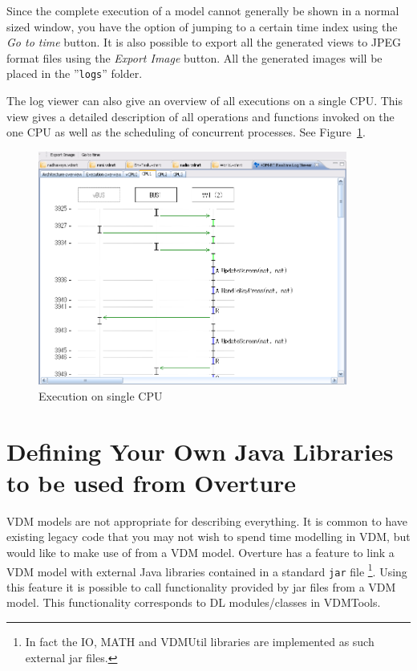 \documentclass{overturerepchap}
\begin{document}
Since the complete execution of a model cannot generally be shown in a normal
sized window, you have the option of jumping to a certain time index
using the \emph{Go to time} button. It is
also possible to export all the generated views to JPEG format files
using the \emph{Export Image} button. All
the generated images will be placed in the ''\texttt{logs}'' folder.

The log viewer can
also give an overview of all executions on a single CPU. This view
gives a detailed description of all operations and functions invoked
on the one CPU as well as the scheduling of concurrent processes. See
Figure~\ref{fig:userguide:ExecutionCPU}. 

\begin{figure}[htp]
\begin{center}
  \includegraphics[width=4in]{figures/ExecutionCPU}
  \caption{Execution on single CPU}
  \label{fig:userguide:ExecutionCPU}
\end{center}
\end{figure}

\chapter{Defining Your Own Java Libraries to be used from Overture}\label{sec:javalibs}

VDM models are not appropriate for describing everything. It is common
to have existing legacy code that you may not
wish to spend time modelling in VDM, but would like to make use of
from a VDM model. Overture has a feature to link a VDM
model with external Java libraries contained in a standard \texttt{jar} file
\footnote{In fact the IO, MATH and VDMUtil libraries are implemented as such
external jar files.}.
Using this feature it is possible 
to call functionality provided by jar files from a VDM model. This functionality
corresponds to DL modules/classes in VDMTools\cite{DLMan}.
\end{document}
